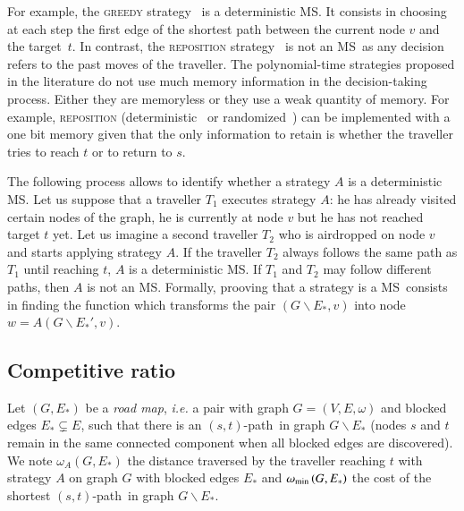 \documentclass[preprint]{elsarticle}
\newcommand{\stpath}{$(s,t)$-path}
\newcommand{\omegamin}{\omega_{\mbox{\scriptsize{min}}}}
\newcommand{\mts}{MS}
\begin{document}
For example, the \textsc{greedy} strategy~\cite{XuHuSuZh09} is a deterministic \mts . It consists in choosing at each step the first edge of the shortest path between the current node $v$ and the target~$t$. 
In contrast, the \textsc{reposition} strategy~\cite{We08} is not an \mts ~as any decision refers to the past moves of the traveller. The polynomial-time strategies proposed in the literature do not use much memory information in the decision-taking process. Either they are memoryless or they use a weak quantity of memory. For example, \textsc{reposition} (deterministic~\cite{We08} or randomized~\cite{BeWe15}) can be implemented with a  one bit memory given that the only information to retain is whether the traveller tries to reach $t$ or to return to $s$.

The following process allows to identify whether a strategy $A$ is a deterministic \mts . Let us suppose that a traveller $T_1$ executes strategy $A$: he has already visited certain nodes of the graph, he is currently at node $v$ but he has not reached target $t$ yet. Let us imagine a second traveller $T_2$ who is airdropped on node $v$ and starts applying strategy $A$. If the traveller $T_2$ always follows the same path as $T_1$ until reaching $t$, $A$ is a deterministic \mts . If $T_1$ and $T_2$ may follow different paths, then $A$ is not an \mts . Formally, prooving that a strategy is a \mts ~consists in finding the function which transforms the pair $\left(G\backslash E_*,v\right)$ into node $w = A\left(G\backslash E_*',v\right)$.

\subsection{Competitive ratio} \label{subsec:compratio}

Let $\left(G,E_*\right)$ be a \textit{road map}, {\em i.e.} a pair with graph $G=\left(V,E,\omega\right)$ and blocked edges $E_* \subsetneq E$, such that there is an \stpath ~in graph $G\backslash E_*$ (nodes $s$ and $t$ remain in the same connected component when all blocked edges are discovered). We note $\omega_A\left(G,E_*\right)$ the distance traversed by the traveller reaching $t$ with strategy $A$ on graph $G$ with blocked edges $E_*$ and $\omegamin\left(G,E_*\right)$ the cost of the shortest \stpath ~in graph $G\backslash E_*$.
\end{document}
